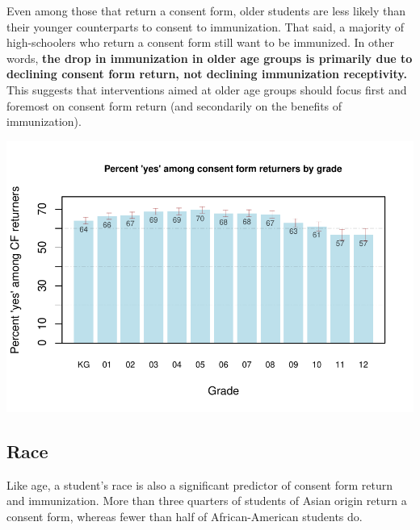 \documentclass{article}
\begin{document}
\begin{multicols}{2}
\begin{multicols}{2}
Even among those that return a consent form, older students are less likely than their younger counterparts to consent to immunization.  That said, a majority of high-schoolers who return a consent form still want to be immunized.  In other words, \textbf{the drop in immunization in older age groups is primarily due to declining consent form return, not declining immunization receptivity.}   This suggests that interventions aimed at older age groups should focus first and foremost on consent form return (and secondarily on the benefits of immunization).


\begin{center}
\includegraphics{superintendent-003}
\end{center}

\subsection*{Race}

Like age, a student's race is also a significant predictor of consent form return and immunization.  More than three quarters of students of Asian origin return a consent form, whereas fewer than half of African-American students do.  


\end{multicols}
\end{multicols}
\end{document}
